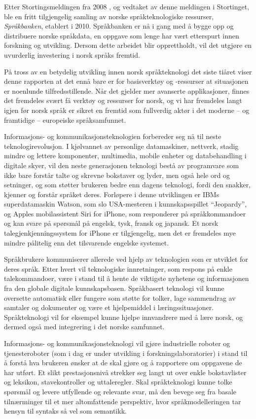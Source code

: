 \begin{multicols}{2}
Etter Stortingsmeldingen fra 2008 \cite{stm35:2008}, og vedtaket av denne meldingen i Stortinget, ble en fritt tilgjengelig samling av norske språkteknologiske ressurser, \emph{Språkbanken}, etablert i 2010. Språkbanken er nå i gang med å bygge opp og distribuere norske språkdata, en oppgave som lenge har vært etterspurt innen forskning og utvikling. Dersom dette arbeidet blir opprettholdt, vil det utgjøre en uvurderlig investering i norsk språks fremtid.     

På tross av en betydelig utvikling innen norsk språkteknologi det siste tiåret viser denne rapporten at det ennå bare er for basisverktøy og -ressurser at situasjonen er noenlunde tilfredsstillende. Når det gjelder mer avanserte applikasjoner, finnes det fremdeles svært få verktøy og ressurser for norsk, og vi har fremdeles langt igjen før norsk språk er sikret en fremtid som fullverdig aktør i det moderne -- og framtidige -- europeiske språksamfunnet.   

Informasjons- og kommunikasjonsteknologien forbereder seg nå til neste teknologirevolusjon. I kjølvannet av personlige datamaskiner, nettverk, stadig mindre og lettere komponenter, multimedia, mobile enheter og databehandling i digitale skyer, vil den neste generasjonen teknologi bestå av programvare som ikke bare forstår talte og skrevne bokstaver og lyder, men også hele ord og setninger, og som støtter brukeren bedre enn dagens teknologi, fordi den snakker, kjenner og forstår språket deres. Forløpere i denne utviklingen er IBMs superdatamaskin Watson, som slo USA-mesteren i kunnskapsspillet “Jeopardy”, og Apples mobilassistent Siri for iPhone, som responderer på språkkommandoer og kan svare på spørsmål på engelsk, tysk, fransk og japansk. Et norsk talegjenkjenningssystem for iPhone er tilgjengelig, men det er fremdeles mye mindre pålitelig enn det tilsvarende engelske systemet. 

Språkbrukere kommuniserer allerede ved hjelp av teknologien som er utviklet for deres språk. Etter hvert vil teknologiske innretninger, som respons på enkle talekommandoer, være i stand til å hente de viktigste nyhetene og informasjonen fra den globale digitale kunnskapsbasen. Språkbasert teknologi vil kunne oversette automatisk eller fungere som støtte for tolker, lage sammendrag av samtaler og dokumenter og være et hjelpemiddel i læringssituasjoner. Språkteknologi vil for eksempel kunne hjelpe innvandrere med å lære norsk, og dermed også med integrering i det norske samfunnet.        
 
Informasjons- og kommunikasjonsteknologi vil gjøre industrielle roboter og tjenesteroboter (som i dag er under utvikling i forskningslaboratorier) i stand til å forstå hva brukeren ønsker at de skal gjøre og å rapportere om oppgavene de har utført. Et slikt prestasjonsnivå strekker seg langt ut over enkle bokstavlister og leksikon, stavekontroller og uttaleregler. Skal språkteknologi kunne tolke spørsmål og levere utfyllende og relevante svar, må den bevege seg fra basale tilnærminger til et mer altomfattende perspektiv, hvor språkmodelleringen tar hensyn til syntaks så vel som semantikk.  


\end{multicols}
